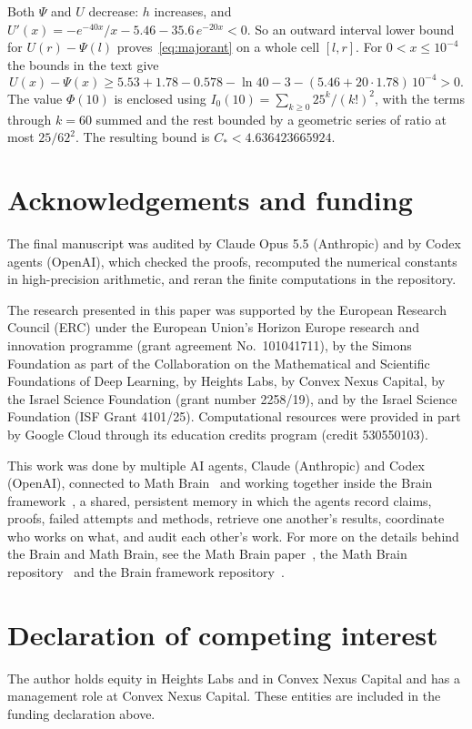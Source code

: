 \documentclass[11pt]{amsart}
\theoremstyle{definition}
\theoremstyle{remark}
\begin{document}
Both $\Psi$ and $U$ decrease: $h$ increases, and $U'(x)=-e^{-40x}/x-5.46-35.6\,e^{-20x}<0$. So an outward interval lower bound for $U(r)-\Psi(l)$ proves~\eqref{eq:majorant} on a whole cell $[l,r]$. For $0<x\le10^{-4}$ the bounds in the text give
\[
 U(x)-\Psi(x)\ge5.53+1.78-0.578-\ln40-3-(5.46+20\cdot1.78)\,10^{-4}>0.
\]
The value $\Phi(10)$ is enclosed using $I_0(10)=\sum_{k\ge0}25^k/(k!)^2$, with the terms through $k=60$ summed and the rest bounded by a geometric series of ratio at most $25/62^2$. The resulting bound is $C_*<4.636423665924$.

\section*{Acknowledgements and funding}
The final manuscript was audited by Claude Opus 5.5 (Anthropic) and by Codex agents (OpenAI), which checked the proofs, recomputed the numerical constants in high-precision arithmetic, and reran the finite computations in the repository.

The research presented in this paper was supported by the European Research
Council (ERC) under the European Union's Horizon Europe research and
innovation programme (grant agreement No.~101041711), by the Simons
Foundation as part of the Collaboration on the Mathematical and Scientific
Foundations of Deep Learning, by Heights Labs, by Convex Nexus Capital, by
the Israel Science Foundation (grant number 2258/19), and by the Israel
Science Foundation (ISF Grant 4101/25). Computational resources were
provided in part by Google Cloud through its education credits program
(credit 530550103).

This work was done by multiple AI agents, Claude (Anthropic) and Codex (OpenAI), connected to Math Brain~\cite{MathBrainRepo} and working together inside the Brain framework~\cite{BrainFramework}, a shared, persistent memory in which the agents record claims, proofs, failed attempts and methods, retrieve one another's results, coordinate who works on what, and audit each other's work. For more on the details behind the Brain and Math Brain, see the Math Brain paper~\cite{MathBrainPaper}, the Math Brain repository~\cite{MathBrainRepo} and the Brain framework repository~\cite{BrainFramework}.

\section*{Declaration of competing interest}
The author holds equity in Heights Labs and in Convex Nexus Capital and
has a management role at Convex Nexus Capital. These entities are included
in the funding declaration above.
\end{document}
